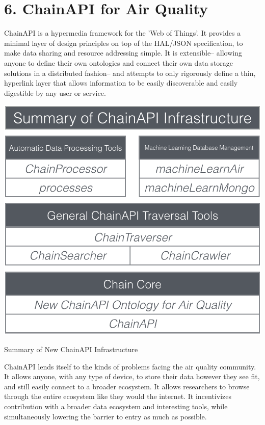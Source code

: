 \chapter{6. ChainAPI for Air Quality}

ChainAPI \cite{chainGit, chainPaper} is a hypermedia framework for the 'Web of Things'.  It provides a minimal layer of design principles on top of the HAL/JSON specification, to make data sharing and resource addressing simple.  It is extensible-- allowing anyone to define their own ontologies and connect their own data storage solutions in a distributed fashion-- and attempts to only rigorously define a thin, hyperlink layer that allows information to be easily discoverable and easily digestible by any user or service.

\begin{marginfigure}
 	\includegraphics[width=\textwidth]{visuals/chainSummary}               
 	 \caption{Summary of New ChainAPI Infrastructure}
  	\label{fig:chain}
\end{marginfigure}

ChainAPI lends itself to the kinds of problems facing the air quality community.  It allows anyone, with any type of device, to store their data however they see fit, and still easily connect to a broader ecosystem.  It allows researchers to browse through the entire ecosystem like they would the internet.  It incentivizes contribution with a broader data ecosystem and interesting tools, while simultaneously lowering the barrier to entry as much as possible.

